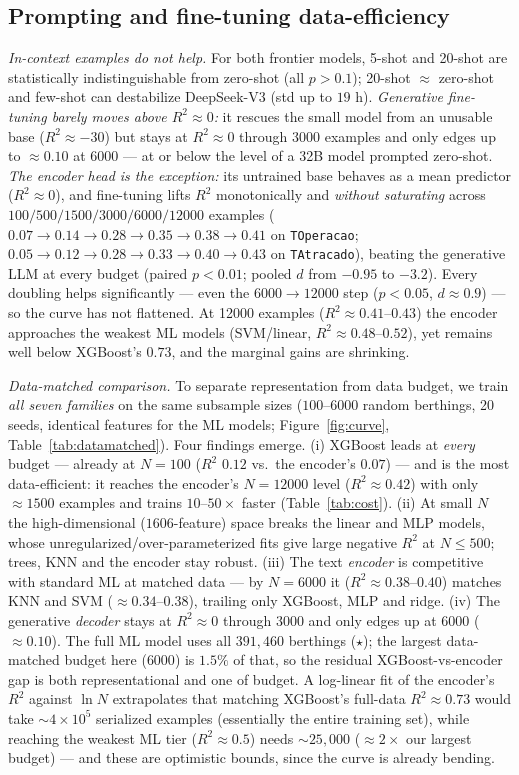 \documentclass[kdmile,a4paper]{kdmile}
\begin{document}
\subsection{Prompting and fine-tuning data-efficiency}
\emph{In-context examples do not help.} For both frontier models, 5-shot and 20-shot are statistically indistinguishable from zero-shot (all $p>0.1$); 20-shot $\approx$ zero-shot and few-shot can destabilize DeepSeek-V3 (std up to $19$ h). \emph{Generative fine-tuning barely moves above $R^2\approx0$:} it rescues the small model from an unusable base ($R^2\approx-30$) but stays at $R^2\approx0$ through 3000 examples and only edges up to $\approx0.10$ at 6000 --- at or below the level of a 32B model prompted zero-shot. \emph{The encoder head is the exception:} its untrained base behaves as a mean predictor ($R^2\approx0$), and fine-tuning lifts $R^2$ monotonically and \emph{without saturating} across $100/500/1500/3000/6000/12000$ examples ($0.07\to0.14\to0.28\to0.35\to0.38\to0.41$ on \texttt{TOperacao}; $0.05\to0.12\to0.28\to0.33\to0.40\to0.43$ on \texttt{TAtracado}), beating the generative LLM at every budget (paired $p<0.01$; pooled $d$ from $-0.95$ to $-3.2$). Every doubling helps significantly --- even the $6000\to12000$ step ($p<0.05$, $d\approx0.9$) --- so the curve has not flattened. At 12000 examples ($R^2\approx0.41$--$0.43$) the encoder approaches the weakest ML models (SVM/linear, $R^2\approx0.48$--$0.52$), yet remains well below XGBoost's $0.73$, and the marginal gains are shrinking.

\noindent\emph{Data-matched comparison.} To separate representation from data budget, we train \emph{all seven families} on the same subsample sizes ($100$--$6000$ random berthings, 20 seeds, identical features for the ML models; Figure~\ref{fig:curve}, Table~\ref{tab:datamatched}). Four findings emerge. (i) XGBoost leads at \emph{every} budget --- already at $N{=}100$ ($R^2$ $0.12$ vs.\ the encoder's $0.07$) --- and is the most data-efficient: it reaches the encoder's $N{=}12000$ level ($R^2\approx0.42$) with only $\approx1500$ examples and trains $10$--$50\times$ faster (Table~\ref{tab:cost}). (ii) At small $N$ the high-dimensional ($1606$-feature) space breaks the linear and MLP models, whose unregularized/over-parameterized fits give large negative $R^2$ at $N\le500$; trees, KNN and the encoder stay robust. (iii) The text \emph{encoder} is competitive with standard ML at matched data --- by $N{=}6000$ it ($R^2\approx0.38$--$0.40$) matches KNN and SVM ($\approx0.34$--$0.38$), trailing only XGBoost, MLP and ridge. (iv) The generative \emph{decoder} stays at $R^2\approx0$ through $3000$ and only edges up at $6000$ ($\approx0.10$). The full ML model uses all $391{,}460$ berthings ($\star$); the largest data-matched budget here ($6000$) is $1.5\%$ of that, so the residual XGBoost-vs-encoder gap is both representational and one of budget. A log-linear fit of the encoder's $R^2$ against $\ln N$ extrapolates that matching XGBoost's full-data $R^2\approx0.73$ would take $\sim\!4\times10^5$ serialized examples (essentially the entire training set), while reaching the weakest ML tier ($R^2\approx0.5$) needs $\sim\!25{,}000$ ($\approx2\times$ our largest budget) --- and these are optimistic bounds, since the curve is already bending.
\end{document}

